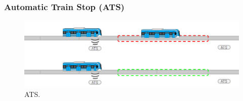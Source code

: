 \subsubsection{Automatic Train Stop (ATS)}

\lipsum[1]

    \begin{figure}[!h]
        \centering
        \includegraphics[width=1\textwidth]{Figuras/ATS}
        \centering\caption{ATS.}
        \label{fig:ATS_1}
    \end{figure}

\lipsum[1]